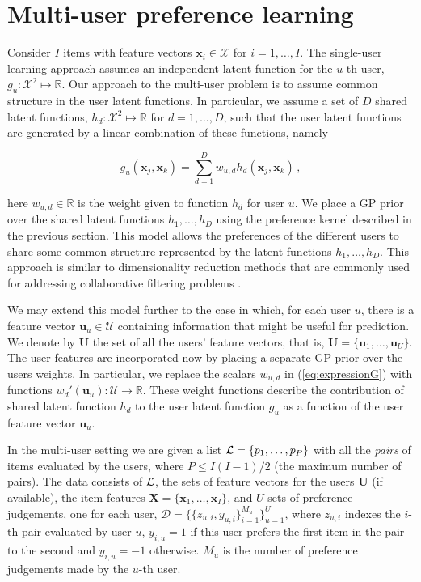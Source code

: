 \section{Multi-user preference learning \label{sec:model}}

Consider $I$ items with feature vectors $\mathbf{x}_i\in\mathcal{X}$ for $i=1,\ldots,I$. 
The single-user learning approach assumes an independent latent function for the $u$-th user,
$g_u:\mathcal{X}^2\mapsto\mathbb{R}$. Our approach to the multi-user problem is to assume common structure
in the user latent functions. In particular, we assume a set of $D$ shared latent functions,
$h_d:\mathcal{X}^2\mapsto \mathbb{R}$ for $d=1,\ldots,D$, such that the user latent functions are 
generated by a linear combination of these functions, namely

\vspace{-0.5cm}
{\small
\begin{equation}
g_{u}(\mathbf{x}_j,\mathbf{x}_k)=\sum_{d=1}^{D}w_{u,d}h_{d}(\mathbf{x}_j,\mathbf{x}_k)\,,\label{eq:expressionG}
\end{equation}
}

\vspace{-0.5cm}
\normalsize here $w_{u,d}\in \mathbb{R}$ is the weight given to function $h_d$ for user $u$.
We place a GP prior over the shared latent functions $h_{1},\ldots,h_{D}$ using the
preference kernel described in the previous section.
This model allows the preferences of the different users to share
some common structure represented by the latent functions $h_{1},\ldots,h_{D}$.
This approach is similar to dimensionality reduction methods that are commonly used for addressing collaborative filtering problems \citep{stern2009,raiko2007}.

We may extend this model further to the case in which, for each user $u$, there is
a feature vector $\mathbf{u}_u \in \mathcal{U}$ containing information that might be useful for prediction.
We denote by $\mathbf{U}$ the set of all the users' feature vectors,
that is, $\mathbf{U} = \{\mathbf{u}_1,\ldots,\mathbf{u}_U\}$.
The user features are incorporated now by placing a separate GP prior over the users weights.
In particular, we replace the scalars $w_{u,d}$ in (\ref{eq:expressionG}) with functions
$w_d'(\mathbf{u}_u):\mathcal{U}\rightarrow\mathcal{\mathbb{R}}$. 
These weight functions describe the contribution of shared latent function
$h_d$ to the user latent function $g_u$ as a function of the user feature vector $\mathbf{u}_u$.

In the multi-user setting we are given a list
$\mathcal{L}=\{p_1,\ldots,p_P\}$ with all the \emph{pairs} of items evaluated by the users, where $P\leq I(I-1)/2$ (the maximum number of pairs).
The data consists of $\mathcal{L}$, the sets of feature vectors for the users $\mathbf{U}$ (if available),
the item features $\mathbf{X}=\{\mathbf{x}_1,\ldots,\mathbf{x}_I\}$, and $U$ sets of preference judgements,
one for each user, $\mathcal{D}=\{\{z_{u,i},y_{u,i}\}_{i=1}^{M_u}\}_{u=1}^{U}$, where $z_{u,i}$ indexes the $i$-th
pair evaluated by user $u$, $y_{i,u}=1$ if this user
prefers the first item in the pair to the second and $y_{i,u}=-1$ otherwise. $M_u$ is the number of 
preference judgements made by the $u$-th user.

